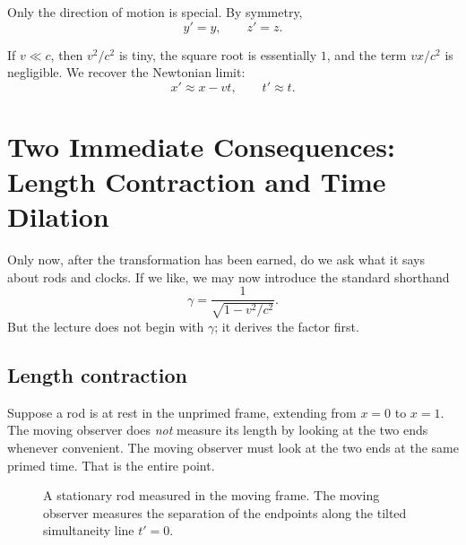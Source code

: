 Only the direction of motion is special. By symmetry,
\begin{equation}
y'=y,\qquad z'=z.
\end{equation}

If \(v\ll c\), then \(v^2/c^2\) is tiny, the square root is essentially \(1\), and the term \(vx/c^2\) is negligible. We recover the Newtonian limit:
\begin{equation}
x'\approx x-vt,\qquad t'\approx t.
\end{equation}

\section{Two Immediate Consequences: Length Contraction and Time Dilation}

Only now, after the transformation has been earned, do we ask what it says about rods and clocks. If we like, we may now introduce the standard shorthand
\begin{equation}
\gamma=\frac{1}{\sqrt{1-v^2/c^2}}.
\end{equation}
But the lecture does not begin with \(\gamma\); it derives the factor first.

\subsection{Length contraction}

Suppose a rod is at rest in the unprimed frame, extending from \(x=0\) to \(x=1\). The moving observer does \emph{not} measure its length by looking at the two ends whenever convenient. The moving observer must look at the two ends at the same primed time. That is the entire point.

\begin{figure}
\centering
{}
\caption{A stationary rod measured in the moving frame. The moving observer measures the separation of the endpoints along the tilted simultaneity line \(t'=0\).}
\end{figure}

